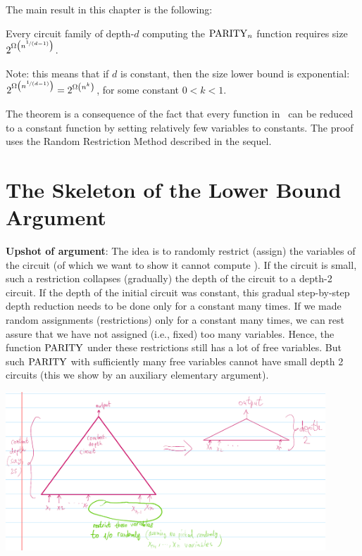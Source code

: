 The main result in this chapter is the following:


\begin{tcolorbox}[colframe=white, colback=blue!11, boxrule=0mm, sharp corners]
\begin{theorem}
\label{thm:ACZ-lower bound}
Every circuit family of depth-$d$ computing the $\operatorname{PARITY}_n$ function requires size $2^{\Omega\left(n^{\nicefrac{1}{(d-1)}}\right)}$.
\end{theorem}
\end{tcolorbox}



Note: this means that if $d$ is constant, then the size lower bound is exponential: $2^{\Omega\left(n^{\nicefrac{1}{(d-1)}}\right)}=
2^{\Omega\left(n^k\right)}$, for some constant $0<k<1$.

The theorem is a consequence of the fact that every function in \ACZ\ can be reduced to a constant function by setting relatively few variables to constants.
The proof uses the Random Restriction Method described in the sequel.

\section{The Skeleton of the Lower Bound Argument}



\begin{tcolorbox}[colframe=white, colback=gray!5, boxrule=0mm, sharp corners]
\textbf{Upshot of argument}: The idea is to randomly restrict (assign) the variables of the circuit (of which we want to show it cannot compute \Parity). If the circuit is small, such a restriction collapses (gradually) the depth of the circuit to a depth-2 circuit. If the depth of the initial circuit was constant, this gradual step-by-step depth reduction needs to be done only for a constant many times. If we made random assignments (restrictions) only for a constant many times, we can rest assure that we have not assigned (i.e., fixed) too many variables. Hence, the function $\operatorname{PARITY}$ under these restrictions still has a lot of free variables. But such $\operatorname{PARITY}$ with sufficiently many free variables cannot have small depth 2 circuits (this we show by an auxiliary elementary argument).
\end{tcolorbox}

\includegraphics[width=0.9\textwidth]{images/image007.png}


